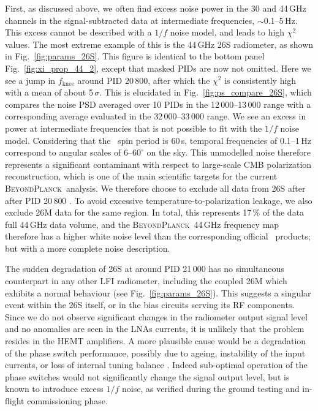 \documentclass[twocolumn]{aa}
\newcommand{\BP}{\textsc{BeyondPlanck}}
\begin{document}
First, as discussed above, we often find excess noise power in the 30
and 44\,GHz channels in the signal-subtracted data at intermediate
frequencies, $\sim$0.1--5\,Hz. This excess cannot be described with a
$1/f$ noise model, and leads to high $\chi^2$ values. The most extreme
example of this is the 44\,GHz 26S radiometer, as shown in
Fig.~\ref{fig:params_26S}. This figure is identical to the bottom
panel Fig.~\ref{fig:xi_prop_44_2}, except that masked PIDs are now not
omitted. Here we see a jump in $f_\mathrm{knee}$ around PID 20\,800,
after which the $\chi^2$ is consistently high with a mean of about
5\,$\sigma$. This is elucidated in Fig.~\ref{fig:ps_compare_26S},
which compares the noise PSD averaged over 10 PIDs in the
12\,000--13\,000 range with a corresponding average evaluated in the
32\,000--33\,000 range. We see an excess in power at intermediate
frequencies that is not possible to fit with the $1/f$ noise
model. Considering that the \Planck\ spin period is 60\,s, temporal
frequencies of 0.1--1\,Hz correspond to angular scales of
6--$60^{\circ}$ on the sky. This unmodelled noise therefore represents
a significant contaminant with respect to large-scale CMB polarization
reconstruction, which is one of the main scientific targets for the
current \BP\ analysis. We therefore choose to exclude all data from
26S after after PID 20\,800 \citep{bp13}. To avoid excessive
temperature-to-polarization leakage, we also exclude 26M data for the
same region. In total, this represents 17\,\% of the data full 44\,GHz
data volume, and the \BP\ 44\,GHz frequency map therefore has a higher
white noise level than the corresponding official \Planck\ products;
but with a more complete noise description.

The sudden degradation of 26S at around PID 21\,000 has no
simultaneous counterpart in any other LFI radiometer, including the
coupled 26M which exhibits a normal behaviour (see
Fig.~\ref{fig:params_26S}).  This suggests a singular event within the
26S itself, or in the bias circuits serving its RF components. Since
we do not observe significant changes in the radiometer output signal
level and no anomalies are seen in the LNAs currents, it is unlikely
that the problem resides in the HEMT amplifiers. A more plausible
cause would be a degradation of the phase switch performance, possibly
due to ageing, instability of the input currents, or loss of internal
tuning balance \citep{mennella2010,cuttaia2009}. Indeed sub-optimal
operation of the phase switches would not significantly change the
signal output level, but is known to introduce excess $1/f$ noise, as
verified during the ground testing and in-flight commissioning phase.
\end{document}
